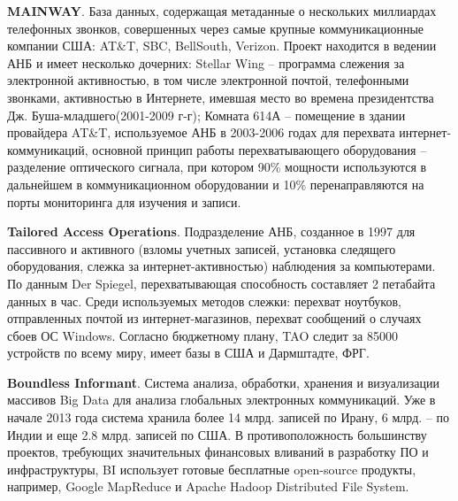 	\textbf{MAINWAY}. База данных, содержащая метаданные о нескольких миллиардах телефонных звонков, совершенных через самые крупные коммуникационные компании США: AT\&T, SBC, BellSouth, Verizon. Проект находится в ведении  АНБ и имеет несколько дочерних: Stellar Wing -- программа слежения за электронной активностью, в том числе электронной почтой, телефонными звонками, активностью в Интернете, имевшая место во времена президентства Дж. Буша-младшего(2001-2009 г-г);%
	Комната 614А -- помещение в здании провайдера AT\&T, используемое АНБ в 2003-2006 годах для перехвата интернет-коммуникаций, %
	основной принцип работы перехватывающего оборудования -- разделение  оптического сигнала, при котором 90\% мощности  используются в дальнейшем в коммуникационном оборудовании и 10\% перенаправляются на порты мониторинга для изучения и записи.
	
	\textbf{Tailored Access Operations}. Подразделение АНБ, созданное в 1997 для пассивного и активного (взломы учетных записей, установка следящего оборудования, слежка за интернет-активностью) наблюдения за компьютерами. По данным Der Spiegel, перехватывающая способность составляет 2 петабайта данных в час. %
	Среди используемых методов слежки: перехват ноутбуков, отправленных почтой из интернет-магазинов, перехват сообщений о случаях сбоев ОС Windows. Согласно бюджетному плану, TAO следит за 85000 устройств по всему миру, имеет базы в США и Дармштадте, ФРГ. 
	
	\textbf{Boundless Informant}. Система анализа, обработки, хранения и визуализации массивов Big Data для анализа глобальных электронных коммуникаций.  Уже в начале 2013 года система хранила более 14 млрд. записей по Ирану, 6 млрд. --  по Индии и еще 2.8 млрд. записей по США. %
	В противоположность большинству проектов, требующих значительных финансовых вливаний в разработку ПО и инфраструктуры, BI использует готовые бесплатные open-source продукты, например, Google MapReduce и  Apache Hadoop Distributed File System.
	
